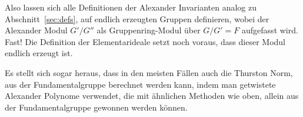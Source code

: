 Also lassen sich alle Definitionen der Alexander Invarianten analog zu Abschnitt~\ref{sec:defs}, auf endlich erzeugten Gruppen definieren, wobei der Alexander Modul $G'/G''$ als Gruppenring-Modul über $G/G'=F$ aufgefasst wird. Fast! Die Definition der Elementarideale setzt noch voraus, dass dieser Modul endlich erzeugt ist.


Es stellt sich sogar heraus, dass in den meisten Fällen auch die Thurston Norm, aus der Fundamentalgruppe berechnet werden kann, indem man getwistete Alexander Polynome verwendet, die mit ähnlichen Methoden wie oben, allein aus der Fundamentalgruppe gewonnen werden können.